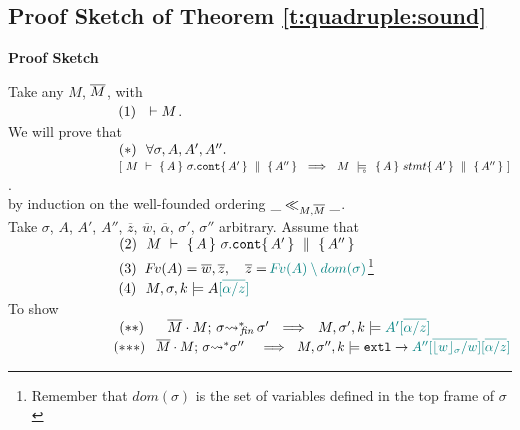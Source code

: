 \subsection{Proof Sketch of Theorem \ref{t:quadruple:sound} }
\label{s:app:proof:sketch;quadruples}
\noindent
\vspace{.2cm}
  {\textbf{Proof Sketch}} 


\noindent
Take any $M$, $\overline{M}$, with\\ 
$\strut \ \ \hspace{2.3cm} \ \ (1) \ \ \vdash M $.
\\
We will prove that\\
$\strut \ \ \hspace{2.3cm} \ \ (*)\ \ \forall \sigma, A, A', A''.$\\
$\strut \ \ \hspace{2.3cm} \ \ \ \ \  \ \ [ \ M\ \vdash\  \quadruple {A} {\sigma.\prg{cont}} {A'} {A''}  \ \ \Longrightarrow \ \    M\ \modelsD\  \quadruple {A} {stmt} {A'} {A''}\ ]$.\\
by induction on the well-founded ordering  $\_ \ll_{M,\overline{M}}  \_$.
\\
Take $\sigma$, $A$, $A'$, $A''$, $\overline z$, $\overline w$, $\overline \alpha$, $\sigma'$, $\sigma''$  arbitrary. Assume that\\
$\strut \ \ \hspace{2.3cm} \ \ (2) \ \ M\ \vdash\  \quadruple {A} {\sigma.\prg{cont}} {A'} {A''}$\\
$\strut \ \ \hspace{2.3cm} \ \ (3) \ \ \fv(A)=\overline {w}, \overline{z}, \ \ \  \overline z = \sdN{\fv(A)\setminus dom(\sigma)}$\footnote{Remember that $dom(\sigma)$ is the set of variables defined in the top frame of $\sigma$} \\
$\strut \ \ \hspace{2.3cm} \ \ (4) \ \ \satDAssertFrom M  \sigma k   {A\sdN{[{\overline { \alpha/z}]}}}$\\
To show\\
$\strut \ \ \hspace{2.3cm} \ \ (**)\ \ \  \ \    \leadstoBoundedStarFin {\Mtwo\cdot M}  {\sigma}  {\sigma'}\ \ \Longrightarrow\ \     \satDAssertFrom M  {\sigma'} k   {\sdN{A'}\sdN{[{\overline {\alpha/z}]}}}$\\
$\strut \ \ \hspace{2.3cm} \ \ (*\!*\!*) \ \ \,    \leadstoBoundedStar  {\Mtwo\cdot M}  {\sigma}  {\sigma''}\ \, \ \ \Longrightarrow\ \     \satDAssertFrom M  {\sigma''}  k  \extThis \rightarrow {\sdN{A''[\overline{\interpret \sigma {w}/w}][{\overline {\alpha/z}}]}}$
 

